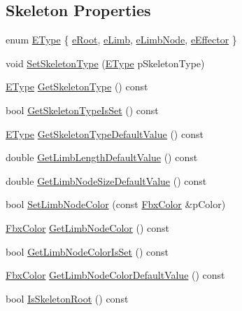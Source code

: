 \subsection*{Skeleton Properties}
\begin{DoxyCompactItemize}
\item 
enum \hyperlink{class_fbx_skeleton_ae067f8fec201e5e3572f039e37ee1c6b}{E\+Type} \{ \hyperlink{class_fbx_skeleton_ae067f8fec201e5e3572f039e37ee1c6badba2b7b1d083860ecf47c6a8452650db}{e\+Root}, 
\hyperlink{class_fbx_skeleton_ae067f8fec201e5e3572f039e37ee1c6baa70a0ce093f640d2408f48d6f9fbb3c8}{e\+Limb}, 
\hyperlink{class_fbx_skeleton_ae067f8fec201e5e3572f039e37ee1c6ba7b14ed4192bd34fd66f6b435df95ed0c}{e\+Limb\+Node}, 
\hyperlink{class_fbx_skeleton_ae067f8fec201e5e3572f039e37ee1c6ba5434375572a5528813528d553ffb758b}{e\+Effector}
 \}
\item 
void \hyperlink{class_fbx_skeleton_af74812971091ce9ece00a145d6f35d48}{Set\+Skeleton\+Type} (\hyperlink{class_fbx_skeleton_ae067f8fec201e5e3572f039e37ee1c6b}{E\+Type} p\+Skeleton\+Type)
\item 
\hyperlink{class_fbx_skeleton_ae067f8fec201e5e3572f039e37ee1c6b}{E\+Type} \hyperlink{class_fbx_skeleton_ae3c3a66d78d51d4decf90df544b63cf9}{Get\+Skeleton\+Type} () const
\item 
bool \hyperlink{class_fbx_skeleton_a50697039232e872c5c2a7beb281d55e6}{Get\+Skeleton\+Type\+Is\+Set} () const
\item 
\hyperlink{class_fbx_skeleton_ae067f8fec201e5e3572f039e37ee1c6b}{E\+Type} \hyperlink{class_fbx_skeleton_a1bff92888a3546492bf12c00b9b43e6e}{Get\+Skeleton\+Type\+Default\+Value} () const
\item 
double \hyperlink{class_fbx_skeleton_ab8ee3f4396ea5cc10988bdc4bb11a993}{Get\+Limb\+Length\+Default\+Value} () const
\item 
double \hyperlink{class_fbx_skeleton_abd7f96a297890ce535821905386b53c9}{Get\+Limb\+Node\+Size\+Default\+Value} () const
\item 
bool \hyperlink{class_fbx_skeleton_a19297c7b85e06e47c34e2a97964d7de8}{Set\+Limb\+Node\+Color} (const \hyperlink{class_fbx_color}{Fbx\+Color} \&p\+Color)
\item 
\hyperlink{class_fbx_color}{Fbx\+Color} \hyperlink{class_fbx_skeleton_a5f3f54bac15d4a4fd51dcb53d987fbf9}{Get\+Limb\+Node\+Color} () const
\item 
bool \hyperlink{class_fbx_skeleton_aebddf26b8d688674a4122c7853419b62}{Get\+Limb\+Node\+Color\+Is\+Set} () const
\item 
\hyperlink{class_fbx_color}{Fbx\+Color} \hyperlink{class_fbx_skeleton_a3d19bee1e36bc2d7285751c3cf62e9b7}{Get\+Limb\+Node\+Color\+Default\+Value} () const
\item 
bool \hyperlink{class_fbx_skeleton_add6b0c308a1a815d0354066420a4bb17}{Is\+Skeleton\+Root} () const
\end{DoxyCompactItemize}
